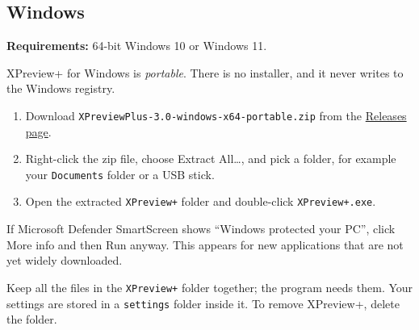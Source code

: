 \documentclass[11pt,a4paper]{article}
\newcommand{\app}{XPreview+}
\newcommand{\ui}[1]{\textsf{#1}}
\newcommand{\file}[1]{\texttt{#1}}
\begin{document}
\subsection{Windows}
\textbf{Requirements:} 64-bit Windows 10 or Windows 11.

\app{} for Windows is \emph{portable}. There is no installer, and it never writes to the
Windows registry.
\begin{enumerate}
  \item Download \file{XPreviewPlus-3.0-windows-x64-portable.zip} from the
        \href{https://github.com/swijeyes/XPreview-Plus/releases/latest}{Releases page}.
  \item Right-click the zip file, choose \ui{Extract All\ldots}, and pick a folder,
        for example your \file{Documents} folder or a USB stick.
  \item Open the extracted \file{XPreview+} folder and double-click \file{XPreview+.exe}.
\end{enumerate}

If Microsoft Defender SmartScreen shows ``Windows protected your PC'', click
\ui{More info} and then \ui{Run anyway}. This appears for new applications that are not yet
widely downloaded.

\begin{note}
Keep all the files in the \file{XPreview+} folder together; the program needs them.
Your settings are stored in a \file{settings} folder inside it. To remove \app{}, delete the folder.
\end{note}
\end{document}
